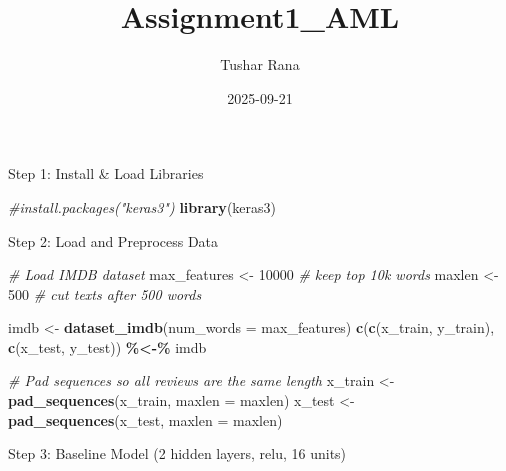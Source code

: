 \documentclass[
]{article}
\title{Assignment1\_AML}
\author{Tushar Rana}
\date{2025-09-21}
\newenvironment{Shaded}{\begin{snugshade}}{\end{snugshade}}
\newcommand{\AttributeTok}[1]{\textcolor[rgb]{0.13,0.29,0.53}{#1}}
\newcommand{\CommentTok}[1]{\textcolor[rgb]{0.56,0.35,0.01}{\textit{#1}}}
\newcommand{\DecValTok}[1]{\textcolor[rgb]{0.00,0.00,0.81}{#1}}
\newcommand{\FunctionTok}[1]{\textcolor[rgb]{0.13,0.29,0.53}{\textbf{#1}}}
\newcommand{\NormalTok}[1]{#1}
\newcommand{\OtherTok}[1]{\textcolor[rgb]{0.56,0.35,0.01}{#1}}
\newcommand{\SpecialCharTok}[1]{\textcolor[rgb]{0.81,0.36,0.00}{\textbf{#1}}}
\begin{document}
\maketitle

Step 1: Install \& Load Libraries

\begin{Shaded}
\begin{Highlighting}[]
\CommentTok{\#install.packages("keras3")}
\FunctionTok{library}\NormalTok{(keras3)}
\end{Highlighting}
\end{Shaded}

Step 2: Load and Preprocess Data

\begin{Shaded}
\begin{Highlighting}[]
\CommentTok{\# Load IMDB dataset}
\NormalTok{max\_features }\OtherTok{\textless{}{-}} \DecValTok{10000}   \CommentTok{\# keep top 10k words}
\NormalTok{maxlen }\OtherTok{\textless{}{-}} \DecValTok{500}           \CommentTok{\# cut texts after 500 words}

\NormalTok{imdb }\OtherTok{\textless{}{-}} \FunctionTok{dataset\_imdb}\NormalTok{(}\AttributeTok{num\_words =}\NormalTok{ max\_features)}
\FunctionTok{c}\NormalTok{(}\FunctionTok{c}\NormalTok{(x\_train, y\_train), }\FunctionTok{c}\NormalTok{(x\_test, y\_test)) }\SpecialCharTok{\%\textless{}{-}\%}\NormalTok{ imdb}

\CommentTok{\# Pad sequences so all reviews are the same length}
\NormalTok{x\_train }\OtherTok{\textless{}{-}} \FunctionTok{pad\_sequences}\NormalTok{(x\_train, }\AttributeTok{maxlen =}\NormalTok{ maxlen)}
\NormalTok{x\_test  }\OtherTok{\textless{}{-}} \FunctionTok{pad\_sequences}\NormalTok{(x\_test,  }\AttributeTok{maxlen =}\NormalTok{ maxlen)}
\end{Highlighting}
\end{Shaded}

Step 3: Baseline Model (2 hidden layers, relu, 16 units)
\end{document}
